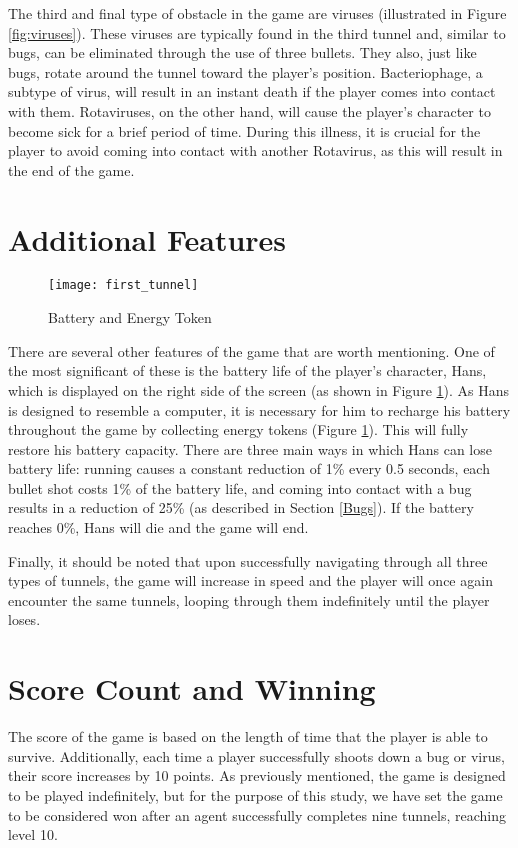 The third and final type of obstacle in the game are viruses (illustrated in Figure \ref{fig:viruses}). These viruses are typically found in the third tunnel and, similar to bugs, can be eliminated through the use of three bullets. They also, just like bugs, rotate around the tunnel toward the player's position. Bacteriophage, a subtype of virus, will result in an instant death if the player comes into contact with them. Rotaviruses, on the other hand, will cause the player's character to become sick for a brief period of time. During this illness, it is crucial for the player to avoid coming into contact with another Rotavirus, as this will result in the end of the game.

\section{Additional Features}
\label{AdditionalFeatures}
\begin{figure}[h]
    \centering
    \texttt{[image: first\_tunnel]}
    \caption{Battery and Energy Token}
    \label{fig:batteryToken}
\end{figure}

There are several other features of the game that are worth mentioning. One of the most significant of these is the battery life of the player's character, Hans, which is displayed on the right side of the screen (as shown in Figure \ref{fig:batteryToken}). As Hans is designed to resemble a computer, it is necessary for him to recharge his battery throughout the game by collecting energy tokens (Figure \ref{fig:batteryToken}). This will fully restore his battery capacity. There are three main ways in which Hans can lose battery life: running causes a constant reduction of 1\% every 0.5 seconds, each bullet shot costs 1\% of the battery life, and coming into contact with a bug results in a reduction of 25\% (as described in Section \ref{Bugs}). If the battery reaches 0\%, Hans will die and the game will end.

Finally, it should be noted that upon successfully navigating through all three types of tunnels, the game will increase in speed and the player will once again encounter the same tunnels, looping through them indefinitely until the player loses.

\section{Score Count and Winning}
The score of the game is based on the length of time that the player is able to survive. Additionally, each time a player successfully shoots down a bug or virus, their score increases by 10 points. As previously mentioned, the game is designed to be played indefinitely, but for the purpose of this study, we have set the game to be considered won after an agent successfully completes nine tunnels, reaching level 10.
